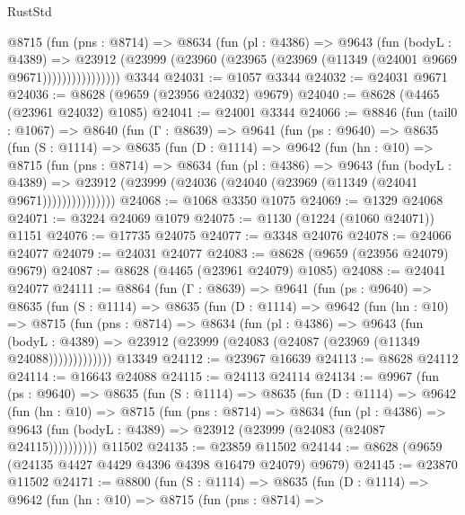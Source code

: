 \begin{lexlean}{RustStd}
\begin{coremodule}
                @8715
                  (fun (pns : @8714) =>
                  @8634
                    (fun (pl : @4386) =>
                    @9643
                      (fun (bodyL : @4389) =>
                      @23912
                        (@23999 (@23960 (@23965 (@23969 (@11349 (@24001 @9669 @9671))))))))))))))))
    @3344
@24031 := @1057 @3344
@24032 := @24031 @9671
@24036 := @8628 (@9659 (@23956 @24032) @9679)
@24040 := @8628 (@4465 (@23961 @24032) @1085)
@24041 := @24001 @3344
@24066 := @8846
    (fun (tail0 : @1067) =>
    @8640
      (fun (Γ : @8639) =>
      @9641
        (fun (ps : @9640) =>
        @8635
          (fun (S : @1114) =>
          @8635
            (fun (D : @1114) =>
            @9642
              (fun (hn : @10) =>
              @8715
                (fun (pns : @8714) =>
                @8634
                  (fun (pl : @4386) =>
                  @9643
                    (fun (bodyL : @4389) =>
                    @23912 (@23999 (@24036 (@24040 (@23969 (@11349 (@24041 @9671)))))))))))))))
@24068 := @1068 @3350 @1075
@24069 := @1329 @24068
@24071 := @3224 @24069 @1079
@24075 := @1130 (@1224 (@1060 @24071)) @1151
@24076 := @17735 @24075
@24077 := @3348 @24076
@24078 := @24066 @24077
@24079 := @24031 @24077
@24083 := @8628 (@9659 (@23956 @24079) @9679)
@24087 := @8628 (@4465 (@23961 @24079) @1085)
@24088 := @24041 @24077
@24111 := @8864
    (fun (Γ : @8639) =>
    @9641
      (fun (ps : @9640) =>
      @8635
        (fun (S : @1114) =>
        @8635
          (fun (D : @1114) =>
          @9642
            (fun (hn : @10) =>
            @8715
              (fun (pns : @8714) =>
              @8634
                (fun (pl : @4386) =>
                @9643
                  (fun (bodyL : @4389) =>
                  @23912 (@23999 (@24083 (@24087 (@23969 (@11349 @24088)))))))))))))
    @13349
@24112 := @23967 @16639
@24113 := @8628 @24112
@24114 := @16643 @24088
@24115 := @24113 @24114
@24134 := @9967
    (fun (ps : @9640) =>
    @8635
      (fun (S : @1114) =>
      @8635
        (fun (D : @1114) =>
        @9642
          (fun (hn : @10) =>
          @8715
            (fun (pns : @8714) =>
            @8634
              (fun (pl : @4386) =>
              @9643 (fun (bodyL : @4389) => @23912 (@23999 (@24083 (@24087 @24115))))))))))
    @11502
@24135 := @23859 @11502
@24144 := @8628 (@9659 (@24135 @4427 @4429 @4396 @4398 @16479 @24079) @9679)
@24145 := @23870 @11502
@24171 := @8800
    (fun (S : @1114) =>
    @8635
      (fun (D : @1114) =>
      @9642
        (fun (hn : @10) =>
        @8715
          (fun (pns : @8714) =>

\end{coremodule}
\end{lexlean}
